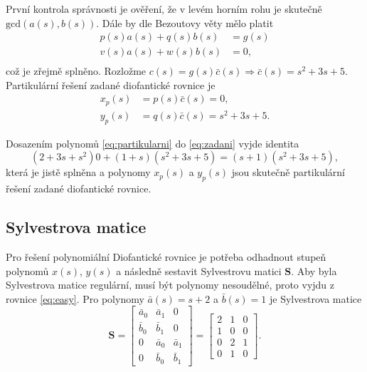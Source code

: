 \documentclass[twoside]{article}
\begin{document}
První kontrola správnosti je ověření, že v levém horním rohu je skutečně $\text{gcd}(a(s), b(s))$.
Dále by dle Bezoutovy věty mělo platit
\begin{equation}
	\begin{aligned}
		p(s)a(s) + q(s)b(s) &= g(s) \\
		v(s)a(s) + w(s)b(s) &= 0, \\
	\end{aligned}
\end{equation}
což je zřejmě splněno. Rozložme $c(s) = g(s)\bar{c}(s) \Rightarrow \bar{c}(s) = s^2 + 3s + 5$.
Partikulární řešení zadané diofantické rovnice je 
\begin{equation}
	\label{eq:partikularni}
	\begin{aligned}
		x_p(s) &= p(s) \bar{c}(s) = 0, \\
		y_p(s) &= q(s) \bar{c}(s) = s^2 + 3s + 5.
	\end{aligned}
\end{equation}

Dosazením polynomů \eqref{eq:partikularni} do \eqref{eq:zadani} vyjde identita
\begin{equation}
	(2 + 3s + s^2)0 + (1 + s)(s^2 + 3s + 5) = (s+1)(s^2 + 3s + 5),
\end{equation}
která je jistě splněna a polynomy $x_p(s)$ a $y_p(s)$ jsou skutečně partikulární řešení zadané diofantické rovnice.

\subsection{Sylvestrova matice}
Pro řešení polynomiální Diofantické rovnice je potřeba odhadnout stupeň polynomů $x(s)$, $y(s)$
a následně sestavit Sylvestrovu matici $\mathbf{S}$. Aby byla Sylvestrova matice regulární, musí být polynomy nesoudělné,
proto vyjdu z rovnice \eqref{eq:easy}. Pro polynomy $\bar{a}(s) = s+2$ a $\bar{b}(s) = 1$ je Sylvestrova matice
\begin{equation}
	\mathbf{S} = \begin{bmatrix}
		\bar{a}_0 & \bar{a}_1 & 0 \\
		\bar{b}_0 & \bar{b}_1 & 0 \\
		0 & \bar{a}_0 & \bar{a}_1 \\
		0 & \bar{b}_0 & \bar{b}_1 
	\end{bmatrix} = \begin{bmatrix}
			2 &   1 &        0\\
			1 &        0 &        0\\
		   0  &  2  &  1               \\
		   0  &  1  &       0
	\end{bmatrix}.
\end{equation}
\end{document}
